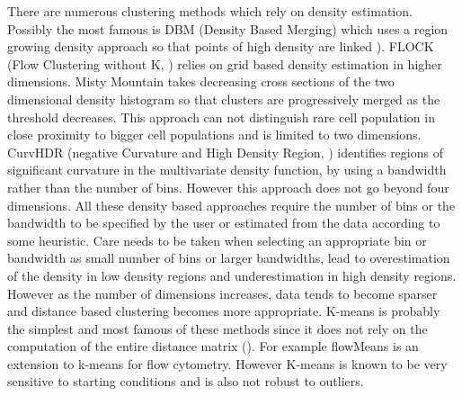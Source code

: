 There are numerous clustering methods which rely on density estimation.
Possibly the most famous is DBM (Density Based Merging) which uses a region growing density approach so that points of high density are linked \cite{Walther:2009gn}).
FLOCK (Flow Clustering without K, \cite{Qian:2010ep}) relies on grid based density estimation in higher dimensions.
Misty Mountain \citep{Sugar:2010jf} takes decreasing cross sections of the two dimensional density histogram so that clusters are progressively merged as the threshold decreases.
This approach can not distinguish rare cell population in close proximity to bigger cell populations and is limited to two dimensions.
CurvHDR (negative Curvature and High Density Region, \citet{Naumann:2010fp}) identifies regions of significant curvature in the multivariate density function,
by using a bandwidth rather than the number of bins.
However this approach does not go beyond four dimensions.
All these density based approaches require the number of bins or the bandwidth to be specified by the user or estimated from the data according to some heuristic.
Care needs to be taken when selecting an appropriate bin or bandwidth as small number of bins or larger bandwidths,
lead to overestimation of the density in low density regions and underestimation in high density regions.
However as the number of dimensions increases, data tends to become sparser and distance based clustering becomes more appropriate.
K-means is probably the simplest and most famous of these methods
since it does not rely on the computation of the entire distance matrix ().
For example flowMeans \citep{Aghaeepour:2010fv} is an extension to k-means for flow cytometry.
However K-means is known to be very sensitive to starting conditions and is also not robust to outliers.
